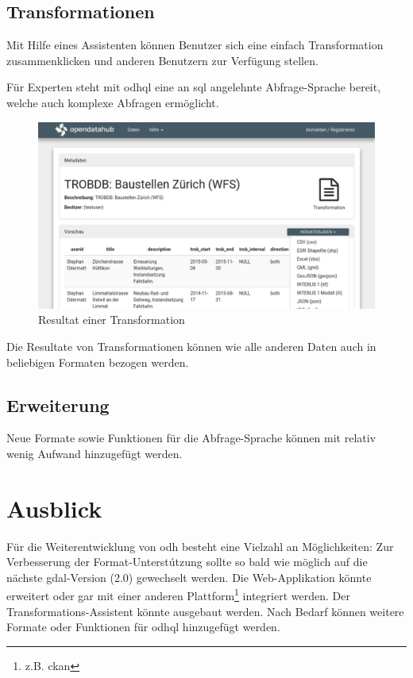 \subsection*{Transformationen}
Mit Hilfe eines Assistenten können Benutzer sich eine einfach Transformation zusammenklicken und anderen Benutzern zur Verfügung stellen. 

Für Experten steht mit \gls{odhql} eine an \gls{sql} angelehnte Abfrage-Sprache bereit, welche auch komplexe Abfragen ermöglicht.

\begin{figure}[H]
    \centering
    \includegraphics[width=2\linewidth/3]{fig/transformation-detail}
    \caption*{Resultat einer Transformation}
\end{figure}

Die Resultate von Transformationen können wie alle anderen Daten auch in beliebigen Formaten bezogen werden.

\subsection*{Erweiterung}
Neue Formate sowie Funktionen für die Abfrage-Sprache können mit relativ wenig Aufwand hinzugefügt werden.

\section*{Ausblick}
\xxx['könnte']
Für die Weiterentwicklung von \acs{odh} besteht eine Vielzahl an Möglichkeiten:
Zur Verbesserung der Format-Unterstútzung sollte so bald wie möglich auf die nächste \gls{gdal}-Version (2.0) gewechselt werden. 
Die Web-Applikation könnte erweitert oder gar mit einer anderen Plattform\footnote{z.B. \gls{ckan}} integriert werden. Der Transformations-Assistent könnte ausgebaut werden. Nach Bedarf können weitere Formate oder Funktionen für \gls{odhql} hinzugefügt werden.